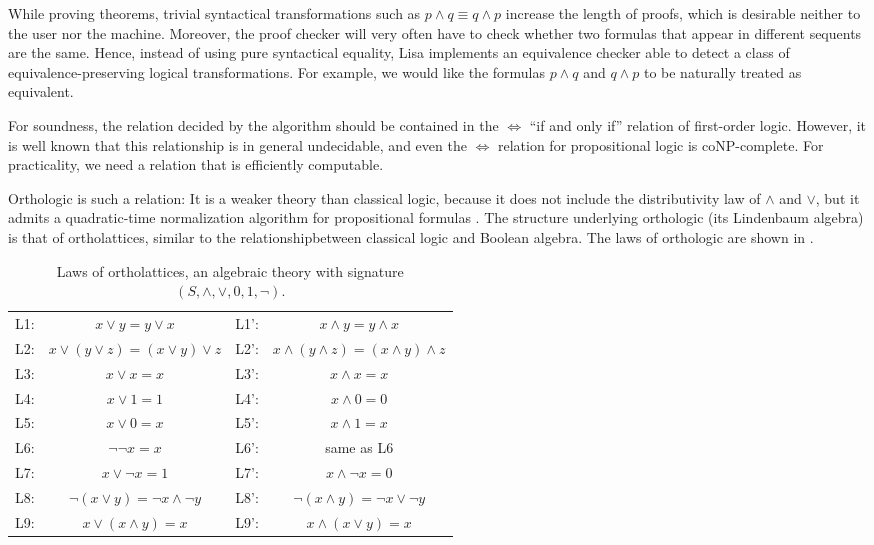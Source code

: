 While proving theorems, trivial syntactical transformations such as $p\land q \equiv q\land p$  increase the length of proofs, which is desirable neither to the user nor the machine. Moreover, the proof checker will very often have to check whether two formulas that appear in different sequents are the same. Hence, instead of using pure syntactical equality, Lisa implements an equivalence checker able to detect a class of equivalence-preserving logical transformations. For example, we would like the  formulas $p\land q$ and $q\land p$ to be naturally treated as equivalent.

For soundness, the relation decided by the algorithm should be contained in the $\iff$ ``if and only if'' relation of first-order logic. However, it is well known that this relationship is in general undecidable, and even the $\iff$ relation for propositional logic is coNP-complete. For practicality, we need a relation that is efficiently computable.

Orthologic is such a relation: It is a weaker theory than classical logic, because it does not include the distributivity law of $\land$ and $\lor$, but it admits a quadratic-time normalization algorithm for propositional formulas \cite{guilloudFormulaNormalizationsVerification2023}. The structure underlying orthologic (its Lindenbaum algebra) is that of ortholattices, similar to the relationshipbetween classical logic and Boolean algebra. The laws of orthologic are shown in .

\begin{table}[bth]
  \centering
  \begin{tabular}{r c @{\hskip 2em} | @{\hskip 2em} r c}
    L1: & $x \lor y = y \lor x$                    & L1': & $x \land y = y \land x$                      \\
    L2: & $x \lor ( y \lor z) = (x \lor y) \lor z$ & L2': & $x \land ( y \land z) = (x \land y) \land z$ \\
    L3: & $x \lor x = x$                           & L3': & $x \land x = x$                              \\
    L4: & $x \lor 1 = 1$                           & L4': & $x \land 0 = 0$                              \\
    L5: & $x \lor 0 = x$                           & L5': & $x \land 1 = x$                              \\
    L6: & $\neg \neg x = x$                        & L6': & same as L6                                   \\
    L7: & $x \lor \neg x = 1$                      & L7': & $x \land \neg x = 0$                         \\
    L8: & $\neg (x \lor y) = \neg x \land \neg y$  & L8': & $\neg (x \land y) = \neg x \lor \neg y$      \\
    L9: & $x \lor (x \land y) = x$                 & L9': & $x \land (x \lor y) = x$                     \\
  \end{tabular}
  \caption{Laws of ortholattices, an algebraic theory with signature $(S, \land, \lor, 0, 1, \neg)$.}
  \label{tab:ortholatticeLaws}
\end{table}


